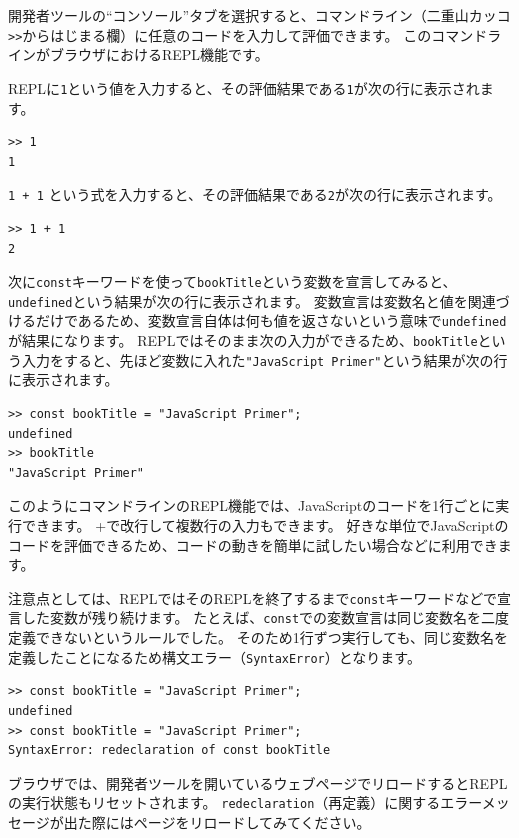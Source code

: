 開発者ツールの``コンソール''タブを選択すると、コマンドライン（二重山カッコ\lstinline{>>}からはじまる欄）に任意のコードを入力して評価できます。
このコマンドラインがブラウザにおけるREPL機能です。

REPLに\texttt{1}という値を入力すると、その評価結果である\texttt{1}が次の行に表示されます。

\begin{lstlisting}
>> 1
1
\end{lstlisting}

\texttt{1 + 1}
という式を入力すると、その評価結果である\texttt{2}が次の行に表示されます。

\begin{lstlisting}
>> 1 + 1
2
\end{lstlisting}

次に\texttt{const}キーワードを使って\texttt{bookTitle}という変数を宣言してみると、\texttt{undefined}という結果が次の行に表示されます。
変数宣言は変数名と値を関連づけるだけであるため、変数宣言自体は何も値を返さないという意味で\texttt{undefined}が結果になります。
REPLではそのまま次の入力ができるため、\texttt{bookTitle}という入力をすると、先ほど変数に入れた\texttt{"JavaScript Primer"}という結果が次の行に表示されます。

\begin{lstlisting}
>> const bookTitle = "JavaScript Primer";
undefined
>> bookTitle
"JavaScript Primer"
\end{lstlisting}

このようにコマンドラインのREPL機能では、JavaScriptのコードを1行ごとに実行できます。
+で改行して複数行の入力もできます。
好きな単位でJavaScriptのコードを評価できるため、コードの動きを簡単に試したい場合などに利用できます。

注意点としては、REPLではそのREPLを終了するまで\texttt{const}キーワードなどで宣言した変数が残り続けます。
たとえば、\texttt{const}での変数宣言は同じ変数名を二度定義できないというルールでした。
そのため1行ずつ実行しても、同じ変数名を定義したことになるため構文エラー（\texttt{SyntaxError}）となります。

\begin{lstlisting}
>> const bookTitle = "JavaScript Primer";
undefined
>> const bookTitle = "JavaScript Primer";
SyntaxError: redeclaration of const bookTitle
\end{lstlisting}

ブラウザでは、開発者ツールを開いているウェブページでリロードするとREPLの実行状態もリセットされます。
\texttt{redeclaration}（再定義）に関するエラーメッセージが出た際にはページをリロードしてみてください。

